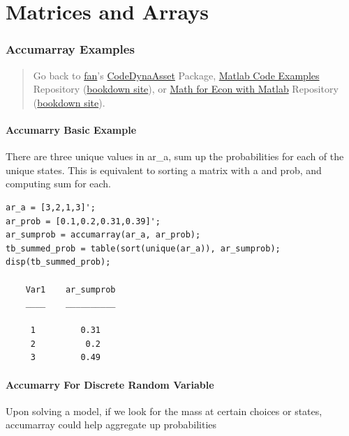 \documentclass[
]{book}
\begin{document}
\hypertarget{matrices-and-arrays}{%
\section{Matrices and Arrays}\label{matrices-and-arrays}}

\hypertarget{accumarray-examples}{%
\subsubsection{Accumarray Examples}\label{accumarray-examples}}

\begin{quote}
Go back to \href{http://fanwangecon.github.io/}{fan}'s \href{https://fanwangecon.github.io/CodeDynaAsset/}{CodeDynaAsset} Package, \href{https://fanwangecon.github.io/M4Econ/}{Matlab Code Examples} Repository (\href{https://fanwangecon.github.io/M4Econ/bookdown}{bookdown site}), or \href{https://fanwangecon.github.io/Math4Econ/}{Math for Econ with Matlab} Repository (\href{https://fanwangecon.github.io/Math4Econ/bookdown}{bookdown site}).
\end{quote}

\hypertarget{accumarry-basic-example}{%
\paragraph{Accumarry Basic Example}\label{accumarry-basic-example}}

There are three unique values in ar\_a, sum up the probabilities for
each of the unique states. This is equivalent to sorting a matrix with a
and prob, and computing sum for each.

\begin{verbatim}
ar_a = [3,2,1,3]';
ar_prob = [0.1,0.2,0.31,0.39]';
ar_sumprob = accumarray(ar_a, ar_prob);
tb_summed_prob = table(sort(unique(ar_a)), ar_sumprob);
disp(tb_summed_prob);

    Var1    ar_sumprob
    ____    __________

     1         0.31   
     2          0.2   
     3         0.49   
\end{verbatim}

\hypertarget{accumarry-for-discrete-random-variable}{%
\paragraph{Accumarry For Discrete Random Variable}\label{accumarry-for-discrete-random-variable}}

Upon solving a model, if we look for the mass at certain choices or
states, accumarray could help aggregate up probabilities
\end{document}
